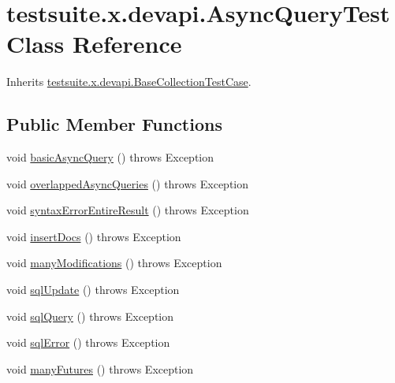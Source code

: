 \hypertarget{classtestsuite_1_1x_1_1devapi_1_1_async_query_test}{}\section{testsuite.\+x.\+devapi.\+Async\+Query\+Test Class Reference}
\label{classtestsuite_1_1x_1_1devapi_1_1_async_query_test}


Inherits \mbox{\hyperlink{classtestsuite_1_1x_1_1devapi_1_1_base_collection_test_case}{testsuite.\+x.\+devapi.\+Base\+Collection\+Test\+Case}}.

\subsection*{Public Member Functions}
\begin{DoxyCompactItemize}
\item 
void \mbox{\hyperlink{classtestsuite_1_1x_1_1devapi_1_1_async_query_test_ae1bdc868bb39647cf5cad4d5eb02a5a2}{basic\+Async\+Query}} ()  throws Exception 
\item 
void \mbox{\hyperlink{classtestsuite_1_1x_1_1devapi_1_1_async_query_test_afccada78cb21e5e1b00a302aa476e44d}{overlapped\+Async\+Queries}} ()  throws Exception 
\item 
void \mbox{\hyperlink{classtestsuite_1_1x_1_1devapi_1_1_async_query_test_a2555da3829874adee73f7bcc760ea9a6}{syntax\+Error\+Entire\+Result}} ()  throws Exception 
\item 
void \mbox{\hyperlink{classtestsuite_1_1x_1_1devapi_1_1_async_query_test_abc9381774d07124ba53250b64144dffd}{insert\+Docs}} ()  throws Exception 
\item 
void \mbox{\hyperlink{classtestsuite_1_1x_1_1devapi_1_1_async_query_test_a816f1d96bd822dadf4e250645dbc7d68}{many\+Modifications}} ()  throws Exception 
\item 
void \mbox{\hyperlink{classtestsuite_1_1x_1_1devapi_1_1_async_query_test_a7aed75acab56c3a607d75fc7f6aba678}{sql\+Update}} ()  throws Exception 
\item 
void \mbox{\hyperlink{classtestsuite_1_1x_1_1devapi_1_1_async_query_test_a4c6be0e47b416b5cd792e22b7ce1f3d8}{sql\+Query}} ()  throws Exception 
\item 
void \mbox{\hyperlink{classtestsuite_1_1x_1_1devapi_1_1_async_query_test_a956a076e0c4cf5517c12d9dc62a0be90}{sql\+Error}} ()  throws Exception 
\item 
void \mbox{\hyperlink{classtestsuite_1_1x_1_1devapi_1_1_async_query_test_a68e3c2c8167c2bad493dd7a66f624080}{many\+Futures}} ()  throws Exception 
\end{DoxyCompactItemize}
